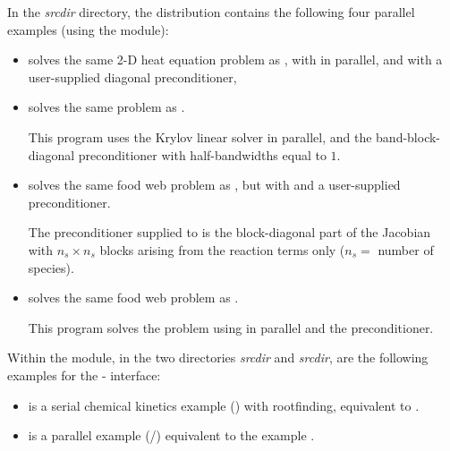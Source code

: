 \vspace{0.2in}\noindent
In the {\em srcdir} directory, the {\ida} 
distribution contains the following four parallel examples 
(using the {\nvecp} module):
\begin{itemize}

\item {}
  solves the same 2-D heat equation problem as , with {\idaspgmr}
  in parallel, and with a user-supplied diagonal preconditioner,
  
\item {}
  solves the same problem as .

  This program  uses the Krylov linear solver {\idaspgmr} in parallel, and the
  band-block-diagonal preconditioner {\idabbdpre} with half-bandwidths equal to $1$.

\item {}
  solves the same food web problem as , but with {\idaspgmr}
  and a user-supplied preconditioner.
  
  The preconditioner supplied to {\idaspgmr} is the block-diagonal part of 
  the Jacobian with $n_s \times n_s$ blocks arising from the reaction terms only
  ($n_s =$ number of species).

\item {}
  solves the same food web problem as .

  This program solves the problem using {\idaspgmr} in parallel and the
  {\idabbdpre} preconditioner.

\end{itemize}

\vspace{0.2in}\noindent
Within the {\fida} module, in the two directories
{\em srcdir} and
{\em srcdir}, are the following
examples for the {\F}-{\C} interface:
%
\begin{itemize}
\item {} is a serial chemical kinetics example ({\dense})
       with rootfinding, equivalent to .

\item {} is a parallel example ({\spgmr}/{\idabbdpre})
       equivalent to the example .

\end{itemize}


